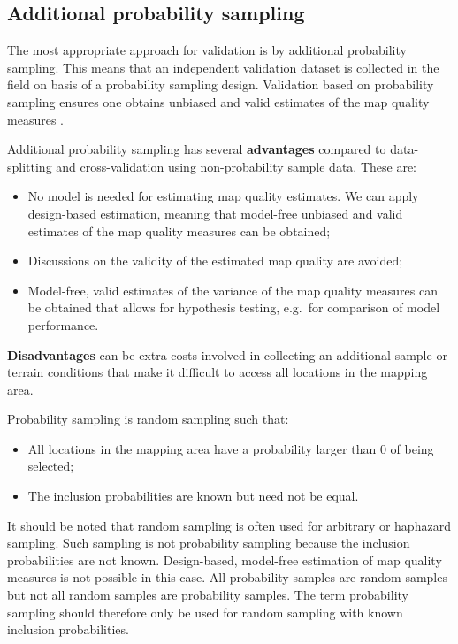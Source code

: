 \documentclass[10pt,b5paper,]{book}
\theoremstyle{definition}
\theoremstyle{definition}
\theoremstyle{definition}
\theoremstyle{remark}
\begin{document}
\hypertarget{addProbSampling}{%
\subsection{Additional probability sampling}\label{addProbSampling}}

The most appropriate approach for validation is by additional
probability sampling. This means that an independent validation dataset
is collected in the field on basis of a probability sampling design.
Validation based on probability sampling ensures one obtains unbiased
and valid estimates of the map quality measures
\citep{brus2011sampling, stehman1999basic}.

Additional probability sampling has several \textbf{advantages} compared
to data-splitting and cross-validation using non-probability sample
data. These are:

\begin{itemize}
\item
  No model is needed for estimating map quality estimates. We can apply
  design-based estimation, meaning that model-free unbiased and valid
  estimates of the map quality measures can be obtained;
\item
  Discussions on the validity of the estimated map quality are avoided;
\item
  Model-free, valid estimates of the variance of the map quality
  measures can be obtained that allows for hypothesis testing, e.g.~for
  comparison of model performance.
\end{itemize}

\textbf{Disadvantages} can be extra costs involved in collecting an
additional sample or terrain conditions that make it difficult to access
all locations in the mapping area.

Probability sampling is random sampling such that:

\begin{itemize}
\item
  All locations in the mapping area have a probability larger than 0 of
  being selected;
\item
  The inclusion probabilities are known but need not be equal.
\end{itemize}

It should be noted that random sampling is often used for arbitrary or
haphazard sampling. Such sampling is not probability sampling because
the inclusion probabilities are not known. Design-based, model-free
estimation of map quality measures is not possible in this case. All
probability samples are random samples but not all random samples are
probability samples. The term probability sampling should therefore only
be used for random sampling with known inclusion probabilities.
\end{document}
